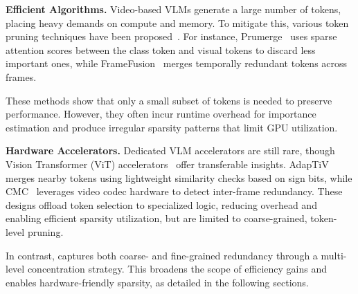 \textbf{Efficient Algorithms.}  
Video-based VLMs generate a large number of tokens, placing heavy demands on compute and memory. To mitigate this, various token pruning techniques have been proposed~\cite{dynamicllava,voco,fastv,liu2025keyframe,wang2025corematching}. 
For instance, Prumerge~\cite{prumerge} uses sparse attention scores between the class token and visual tokens to discard less important ones, while FrameFusion~\cite{fu2024framefusion} merges temporally redundant tokens across frames.

These methods show that only a small subset of tokens is needed to preserve performance. However, they often incur runtime overhead for importance estimation and produce irregular sparsity patterns that limit GPU utilization.

\textbf{Hardware Accelerators.}  
Dedicated VLM accelerators are still rare, though Vision Transformer (ViT) accelerators~\cite{song2024cmc,yoo2024adaptiv,dong2023heatvit} offer transferable insights.  
AdapTiV~\cite{yoo2024adaptiv} merges nearby tokens using lightweight similarity checks based on sign bits, while CMC~\cite{song2024cmc} leverages video codec hardware to detect inter-frame redundancy.
These designs offload token selection to specialized logic, reducing overhead and enabling efficient sparsity utilization, but are limited to coarse-grained, token-level pruning.

In contrast, \proj{} captures both coarse- and fine-grained redundancy through a multi-level concentration strategy. This broadens the scope of efficiency gains and enables hardware-friendly sparsity, as detailed in the following sections.
